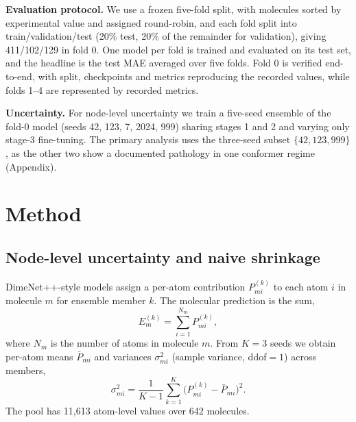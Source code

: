 \documentclass{article}
\begin{document}
\textbf{Evaluation protocol.} We use a frozen five-fold split, with molecules
sorted by experimental value and assigned round-robin, and each fold split
into train/validation/test (20\% test, 20\% of the remainder for validation),
giving 411/102/129 in fold 0. One model per fold is trained and evaluated on
its test set, and the headline is the test MAE averaged over five folds. Fold 0
is verified end-to-end, with split, checkpoints and metrics reproducing the
recorded values, while folds 1--4 are represented by recorded metrics.

\textbf{Uncertainty.} For node-level uncertainty we train a five-seed ensemble
of the fold-0 model (seeds 42, 123, 7, 2024, 999) sharing stages 1 and 2 and
varying only stage-3 fine-tuning. The primary analysis uses the three-seed
subset $\{42, 123, 999\}$, as the other two show a documented pathology in
one conformer regime (Appendix).

\section{Method}
\label{sec:method}

\subsection{Node-level uncertainty and naive shrinkage}

DimeNet++-style models assign a per-atom contribution $P_{mi}^{(k)}$ to each
atom $i$ in molecule $m$ for ensemble member $k$. The molecular prediction is
the sum,
\[
E_m^{(k)} = \sum_{i=1}^{N_m} P_{mi}^{(k)} ,
\]
where $N_m$ is the number of atoms in molecule $m$. From $K=3$ seeds we obtain
per-atom means $\bar{P}_{mi}$ and variances
$\sigma_{mi}^2$ (sample variance, ddof$=1$) across members,
\[
\sigma_{mi}^2 = \frac{1}{K-1}\sum_{k=1}^{K} \bigl(P_{mi}^{(k)}-\bar{P}_{mi}\bigr)^2 .
\]
The pool has 11{,}613 atom-level values over 642 molecules.
\end{document}
